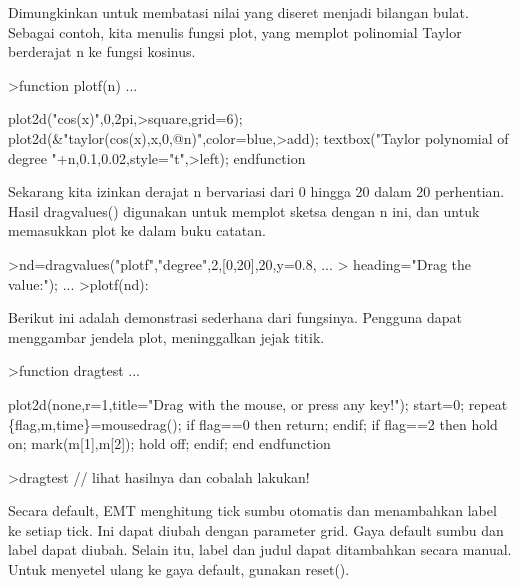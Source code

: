 \documentclass{article}
\begin{document}
\begin{eulernotebook}
\begin{eulercomment}
\begin{eulercomment}
\begin{eulercomment}
\begin{eulercomment}
\begin{eulercomment}
\begin{eulercomment}
\begin{eulercomment}
\begin{eulercomment}
\begin{eulercomment}
\begin{eulercomment}
\begin{eulercomment}
Dimungkinkan untuk membatasi nilai yang diseret menjadi bilangan
bulat. Sebagai contoh, kita menulis fungsi plot, yang memplot
polinomial Taylor berderajat n ke fungsi kosinus.
\end{eulercomment}
\begin{eulerprompt}
>function plotf(n) ...
\end{eulerprompt}
\begin{eulerudf}
  plot2d("cos(x)",0,2pi,>square,grid=6);
  plot2d(&"taylor(cos(x),x,0,@n)",color=blue,>add);
  textbox("Taylor polynomial of degree "+n,0.1,0.02,style="t",>left);
  endfunction
\end{eulerudf}
\begin{eulercomment}
Sekarang kita izinkan derajat n bervariasi dari 0 hingga 20 dalam 20
perhentian. Hasil dragvalues() digunakan untuk memplot sketsa dengan n
ini, dan untuk memasukkan plot ke dalam buku catatan.
\end{eulercomment}
\begin{eulerprompt}
>nd=dragvalues("plotf","degree",2,[0,20],20,y=0.8, ...
>   heading="Drag the value:"); ...
>plotf(nd):
\end{eulerprompt}
\begin{eulercomment}
Berikut ini adalah demonstrasi sederhana dari fungsinya. Pengguna
dapat menggambar jendela plot, meninggalkan jejak titik.
\end{eulercomment}
\begin{eulerprompt}
>function dragtest ...
\end{eulerprompt}
\begin{eulerudf}
    plot2d(none,r=1,title="Drag with the mouse, or press any key!");
    start=0;
    repeat
      \{flag,m,time\}=mousedrag();
      if flag==0 then return; endif;
      if flag==2 then
        hold on; mark(m[1],m[2]); hold off;
      endif;
    end
  endfunction
\end{eulerudf}
\begin{eulerprompt}
>dragtest // lihat hasilnya dan cobalah lakukan!
\end{eulerprompt}
\begin{eulercomment}
Secara default, EMT menghitung tick sumbu otomatis dan menambahkan
label ke setiap tick. Ini dapat diubah dengan parameter grid. Gaya
default sumbu dan label dapat diubah. Selain itu, label dan judul
dapat ditambahkan secara manual. Untuk menyetel ulang ke gaya default,
gunakan reset().
\end{eulercomment}

\end{eulercomment}
\end{eulercomment}
\end{eulercomment}
\end{eulercomment}
\end{eulercomment}
\end{eulercomment}
\end{eulercomment}
\end{eulercomment}
\end{eulercomment}
\end{eulercomment}
\end{eulernotebook}
\end{document}
